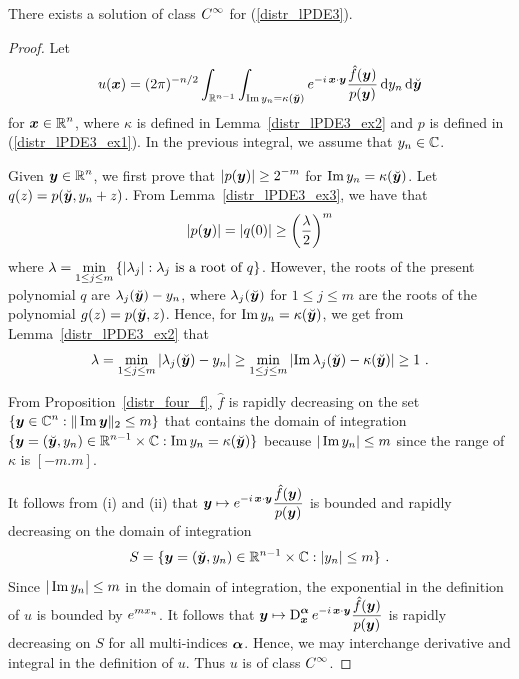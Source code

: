 \begin{theorem} \label{distr_lPDE3_ex4}
There exists a solution of class $\displaystyle C^\infty$ for
(\ref{distr_lPDE3}).
\end{theorem}

\begin{proof}
Let
\[
u({\bm{x}}) = (2\pi)^{-n/2} \int_{\mathbb{R}^{n-1}}
\int_{\operatorname{Im} y_n = \kappa(\breve{{\bm{y}}})}
e^{-i\, {\bm{x}}\cdot{\bm{y}}}
\frac{\hat{f}({\bm{y}})}{p({\bm{y}})} \,\mathrm{d}{y_n}\,\mathrm{d}{\breve{{\bm{y}}}}
\]
for $\displaystyle {\bm{x}} \in \mathbb{R}^n$, where $\kappa$ is defined in
Lemma~\ref{distr_lPDE3_ex2} and $p$ is defined in
(\ref{distr_lPDE3_ex1}).  In the previous integral, we
assume that $y_n \in \mathbb{C}$.

 Given $\displaystyle {\bm{y}} \in \mathbb{R}^n$, we first prove that
$\displaystyle |p({\bm{y}})| \geq 2^{-m}$ for
$\operatorname{Im} y_n = \kappa(\breve{{\bm{y}}})$.
Let $q(z) = p(\breve{{\bm{y}}}, y_n+z)$.
From Lemma~\ref{distr_lPDE3_ex3}, we have that
\[
\left| p({\bm{y}}) \right| = \left| q(0) \right| \geq
\left(\frac{\lambda}{2}\right)^m
\]
where
$\displaystyle
\lambda = \min_{1\leq j\leq m} \left\{ \left|\lambda_j\right| : \lambda_j
\ \text{is a root of} \ q \right\}$.
However, the roots of the present polynomial $q$ are
$\lambda_j(\breve{{\bm{y}}}) - y_n$, where $\lambda_j(\breve{{\bm{y}}})$ for
$1\leq j \leq m$ are the roots of the polynomial
$\displaystyle g(z) = p(\breve{{\bm{y}}}, z)$. Hence,
for $\operatorname{Im} y_n = \kappa(\breve{{\bm{y}}})$, we get from
Lemma~\ref{distr_lPDE3_ex2} that
\[
\lambda = \min_{1\leq j \leq m}
\left| \lambda_j(\breve{{\bm{y}}}) - y_n \right|
\geq \min_{1\leq j \leq m}
\left|\operatorname{Im} \lambda_j(\breve{{\bm{y}}}) - \kappa(\breve{{\bm{y}}}) \right|
\geq 1 \ .
\]

From Proposition~\ref{distr_four_f}, $\hat{f}$ is rapidly decreasing
on the set $\displaystyle \{{\bm{y}} \in \mathbb{C}^n : \|\operatorname{Im} {\bm{y}}\|_2 \leq m \}$
that contains the domain of integration
$\displaystyle \{ {\bm{y}} = (\breve{{\bm{y}}}, y_n) \in \mathbb{R}^{n-1}\times \mathbb{C} :
\operatorname{Im} y_n = \kappa(\breve{{\bm{y}}}) \}$ because
$|\operatorname{Im} y_n| \leq m$ since the range of $\kappa$ is $[-m.m]$.

It follows from (i) and (ii) that $\displaystyle
{\bm{y}} \mapsto e^{-i\, {\bm{x}}\cdot{\bm{y}}} \frac{\hat{f}({\bm{y}})}{p({\bm{y}})}$
is bounded and rapidly decreasing on the domain of integration
\[
S = \{{\bm{y}} = (\breve{{\bm{y}}}, y_n) \in \mathbb{R}^{n-1}\times \mathbb{C} :
|y_n| \leq m \} \ .
\]
Since $|\operatorname{Im} y_n|\leq m$ in the domain of integration, the
exponential in the definition of $u$ is bounded by $\displaystyle e^{m x_n}$.
It follows that
$\displaystyle {\bm{y}} \mapsto \operatorname{D}_{{\bm{x}}}^{{\bm{\alpha}}}
e^{-i\, {\bm{x}}\cdot{\bm{y}}} \frac{\hat{f}({\bm{y}})}{p({\bm{y}})}$
is rapidly decreasing on $S$ for all multi-indices ${\bm{\alpha}}$.
Hence, we may interchange derivative and integral in the definition of
$u$.  Thus $u$ is of class $\displaystyle C^\infty$.


\end{proof}
